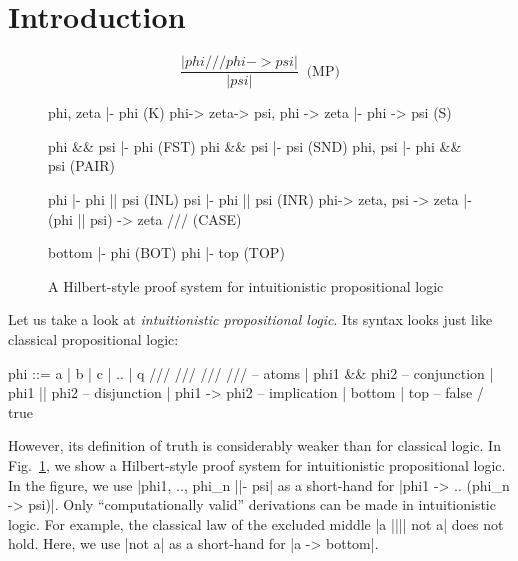 \documentclass{llncs}
\begin{document}
\section{Introduction}

\begin{figure}[t]
\begin{center}
$$
\frac{|phi /// phi -> psi|}{|psi|}\;\;\mbox{(MP)}
$$
\begin{code}
                      phi, zeta    |- phi                       (K)
phi->   zeta-> psi,   phi -> zeta  |- phi -> psi                (S)

                      phi && psi   |- phi                       (FST)
                      phi && psi   |- psi                       (SND)
                      phi, psi     |- phi && psi                (PAIR)

                      phi          |- phi || psi                (INL)
                      psi          |- phi || psi                (INR)
        phi-> zeta,   psi -> zeta  |- (phi || psi) -> zeta ///  (CASE)

                      bottom       |- phi                       (BOT)
                      phi          |- top                       (TOP)
\end{code}
\vspace{-0.7cm}\end{center}
\label{fig:hilbert}
\caption{A Hilbert-style proof system for intuitionistic propositional logic}
\end{figure}

Let us take a look at {\em intuitionistic propositional logic}. Its syntax looks just like classical propositional logic:
\begin{code}
phi  ::=  a | b | c | .. | q /// /// /// ///  -- atoms
     |    phi1 && phi2                        -- conjunction
     |    phi1 || phi2                        -- disjunction
     |    phi1 -> phi2                        -- implication
     |    bottom | top                        -- false / true
\end{code}
However, its definition of truth is considerably weaker than for classical logic. In Fig.\ \ref{fig:hilbert}, we show a Hilbert-style proof system for intuitionistic propositional logic. In the figure, we use |phi1, .., phi_n ||- psi| as a short-hand for |phi1 -> .. (phi_n -> psi)|. Only ``computationally valid'' derivations can be made in intuitionistic logic. For example, the classical law of the excluded middle |a |||| not a| does not hold. Here, we use |not a| as a short-hand for |a -> bottom|.
\end{document}
